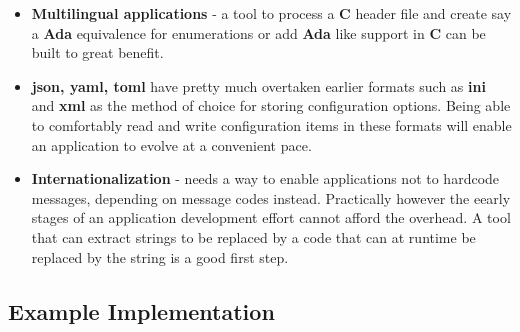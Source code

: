 \documentclass[12pt, a4paper]{article}
\begin{document}
\begin{itemize}
    \item \textbf{Multilingual applications} - a tool to process a \textbf{C} header file and create say a \textbf{Ada} equivalence for enumerations or 
    add \textbf{Ada} like support in \textbf{C} can be built to great benefit.
    \item \textbf{json, yaml, toml} have pretty much overtaken earlier formats
    such as \textbf{ini} and \textbf{xml} as the method of choice for storing configuration options. Being able to comfortably read and write configuration items in these formats will enable an application to evolve at a convenient pace.
    \item \textbf{Internationalization} - needs a way to enable applications not to
    hardcode messages, depending on message codes instead. Practically however the eearly stages of an application development effort cannot afford the overhead. A tool that can extract strings to be replaced by a code that can at runtime be replaced by the string is a good first step.
\end{itemize}

\subsection{Example Implementation}

\end{document}
